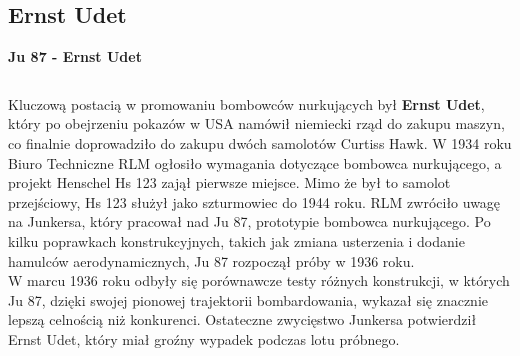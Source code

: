 
\subsection{Ernst Udet}


\begin{frame}{\Huge{\textbf{Ju 87 - Ernst Udet}}}
	\begin{columns}[t]
			\justifying
			
Kluczową postacią w promowaniu bombowców nurkujących był \textbf{Ernst Udet}, który po obejrzeniu pokazów w USA namówił niemiecki rząd do zakupu maszyn, co finalnie doprowadziło do zakupu dwóch samolotów Curtiss Hawk. W 1934 roku Biuro Techniczne RLM ogłosiło wymagania dotyczące bombowca nurkującego, a projekt Henschel Hs 123 zajął pierwsze miejsce. Mimo że był to samolot przejściowy, Hs 123 służył jako szturmowiec do 1944 roku. RLM zwróciło uwagę na Junkersa, który pracował nad Ju 87, prototypie bombowca nurkującego. Po kilku poprawkach konstrukcyjnych, takich jak zmiana usterzenia i dodanie hamulców aerodynamicznych, Ju 87 rozpoczął próby w 1936 roku. \\
W marcu 1936 roku odbyły się porównawcze testy różnych konstrukcji, w których Ju 87, dzięki swojej pionowej trajektorii bombardowania, wykazał się znacznie lepszą celnością niż konkurenci. Ostateczne zwycięstwo Junkersa potwierdził Ernst Udet, który miał groźny wypadek podczas lotu próbnego.


\end{columns}
\end{frame}
